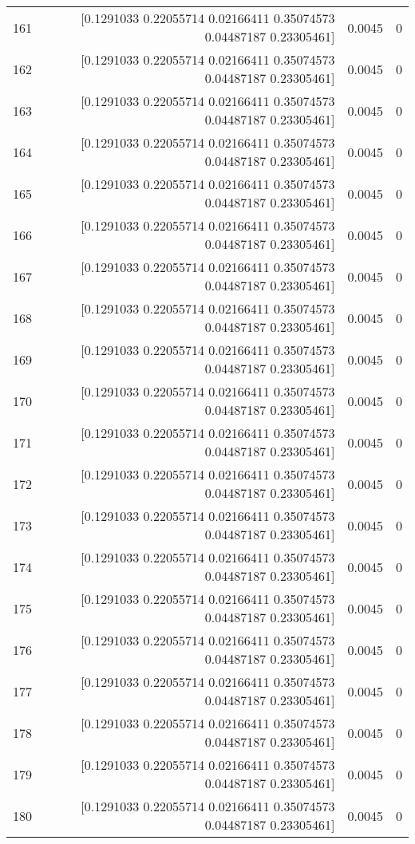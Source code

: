 \begin{longtable}{lrrr}
161 & [0.1291033  0.22055714 0.02166411 0.35074573 0.04487187 0.23305461] & 0.0045 & 0 \\
162 & [0.1291033  0.22055714 0.02166411 0.35074573 0.04487187 0.23305461] & 0.0045 & 0 \\
163 & [0.1291033  0.22055714 0.02166411 0.35074573 0.04487187 0.23305461] & 0.0045 & 0 \\
164 & [0.1291033  0.22055714 0.02166411 0.35074573 0.04487187 0.23305461] & 0.0045 & 0 \\
165 & [0.1291033  0.22055714 0.02166411 0.35074573 0.04487187 0.23305461] & 0.0045 & 0 \\
166 & [0.1291033  0.22055714 0.02166411 0.35074573 0.04487187 0.23305461] & 0.0045 & 0 \\
167 & [0.1291033  0.22055714 0.02166411 0.35074573 0.04487187 0.23305461] & 0.0045 & 0 \\
168 & [0.1291033  0.22055714 0.02166411 0.35074573 0.04487187 0.23305461] & 0.0045 & 0 \\
169 & [0.1291033  0.22055714 0.02166411 0.35074573 0.04487187 0.23305461] & 0.0045 & 0 \\
170 & [0.1291033  0.22055714 0.02166411 0.35074573 0.04487187 0.23305461] & 0.0045 & 0 \\
171 & [0.1291033  0.22055714 0.02166411 0.35074573 0.04487187 0.23305461] & 0.0045 & 0 \\
172 & [0.1291033  0.22055714 0.02166411 0.35074573 0.04487187 0.23305461] & 0.0045 & 0 \\
173 & [0.1291033  0.22055714 0.02166411 0.35074573 0.04487187 0.23305461] & 0.0045 & 0 \\
174 & [0.1291033  0.22055714 0.02166411 0.35074573 0.04487187 0.23305461] & 0.0045 & 0 \\
175 & [0.1291033  0.22055714 0.02166411 0.35074573 0.04487187 0.23305461] & 0.0045 & 0 \\
176 & [0.1291033  0.22055714 0.02166411 0.35074573 0.04487187 0.23305461] & 0.0045 & 0 \\
177 & [0.1291033  0.22055714 0.02166411 0.35074573 0.04487187 0.23305461] & 0.0045 & 0 \\
178 & [0.1291033  0.22055714 0.02166411 0.35074573 0.04487187 0.23305461] & 0.0045 & 0 \\
179 & [0.1291033  0.22055714 0.02166411 0.35074573 0.04487187 0.23305461] & 0.0045 & 0 \\
180 & [0.1291033  0.22055714 0.02166411 0.35074573 0.04487187 0.23305461] & 0.0045 & 0 \\

\end{longtable}
